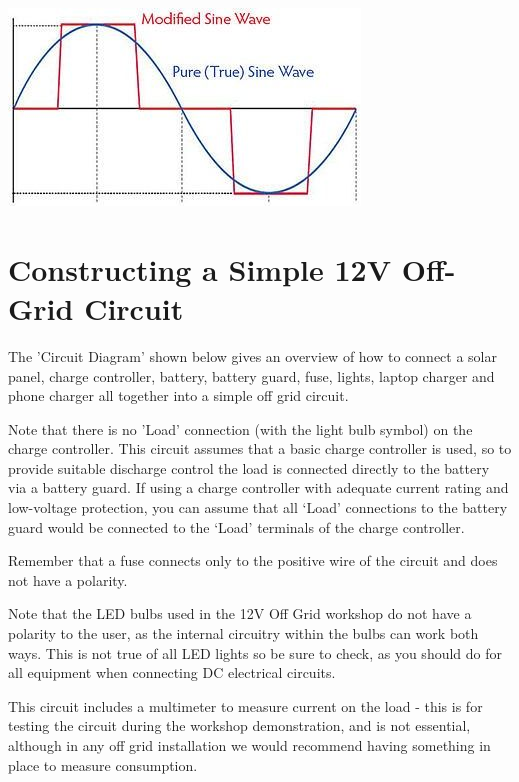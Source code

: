 \documentclass{article}
\theoremstyle{definition}
\theoremstyle{definition}
\theoremstyle{remark}
\begin{document}
    \begin{center}
      \includegraphics[width=0.30\paperwidth]{Images/image_10_2_(sine_wave).png}
    \end{center}
  


{\color{blue}\section{Constructing a Simple 12V Off-Grid Circuit}} %
\label{sec:constructing_a_simple_12v_off_grid_circuit}

  The 'Circuit Diagram' shown below gives an overview of how to connect a solar panel, charge controller, battery, battery guard, fuse, lights, laptop charger and phone charger all together into a simple off grid circuit. 

  Note that there is no 'Load' connection (with the light bulb symbol) on the charge controller. This circuit assumes that a basic charge controller is used, so to provide suitable discharge control the load is connected directly to the battery via a battery guard. If using a charge controller with adequate current rating and low-voltage protection, you can assume that all ‘Load’ connections to the battery guard would be connected to the ‘Load’ terminals of the charge controller.

  Remember that a fuse connects only to the positive wire of the circuit and does not have a polarity.

  Note that the LED bulbs used in the 12V Off Grid workshop do not have a polarity to the user, as the internal circuitry within the bulbs can work both ways. This is not true of all LED lights so be sure to check, as you should do for all equipment when connecting DC electrical circuits.

  This circuit includes a multimeter to measure current on the load - this is for testing the circuit during the workshop demonstration, and is not essential, although in any off grid installation we would recommend having something in place to measure consumption.
\end{document}
